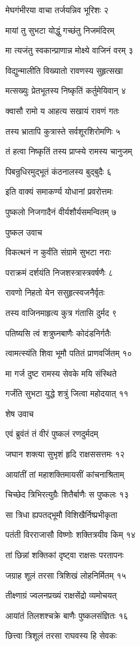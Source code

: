 मेघगंभीरया वाचा तर्जयन्निव भूरिशः २

मायां तु सुभटा योद्धुं गच्छंतु निजमंदिरम्

मा त्यजंतु स्वकान्प्राणान्न मोक्ष्ये वाजिनं वरम् ३

विद्युन्मालीति विख्यातो रावणस्य सुहृत्सखा

मत्सख्युः प्रेतभूतस्य निष्कृतिं कर्तुमेयिवान् ४

क्वासौ रामो य आहत्य सखायं रावणं गतः

तस्य भ्रातापि कुत्रास्ते सर्वशूरशिरोमणिः ५

तं हत्वा निष्कृतिं तस्य प्राप्स्ये रामस्य चानुजम्

पिबन्रुधिरमुद्भूतं कंठनालस्य बुद्बुदैः ६

इति वाक्यं समाकर्ण्य योधानां प्रवरोत्तमः

पुष्कलो निजगादैनं वीर्यशौर्यसमन्वितम् ७

पुष्कल उवाच

विकत्थनं न कुर्वंति संग्रामे सुभटा नराः

पराक्रमं दर्शयंति निजशस्त्रास्त्रवर्षणैः ८

रावणो निहतो येन ससुहृत्स्वजनैर्वृतः

तस्य वाजिनमाहृत्य कुत्र गंतासि दुर्मद ९

पतिष्यसि त्वं शत्रुघ्नबाणैः कोदंडनिर्गतैः

त्वामत्स्यंति शिवा भूमौ पतितं प्राणवर्जितम् १०

मा गर्ज दुष्ट रामस्य सेवके मयि संस्थिते

गर्जंति सुभटा युद्धे शत्रुं जित्वा महोदयात् ११

शेष उवाच

एवं ब्रुवंतं तं वीरं पुष्कलं रणदुर्मदम्

जघान शक्त्या सुभृशं हृदि राक्षससत्तमः १२

आयांतीं तां महाशक्तिमायसीं कांचनाश्रिताम्

चिच्छेद त्रिभिरत्युग्रैः शितैर्बाणैः स पुष्कलः १३

सा त्रिधा ह्यपतद्भूमौ विशिखैर्निष्प्रभीकृता

पतंती विरराजासौ विष्णोः शक्तित्रयीव किम् १४

तां छिन्नां शक्तिकां दृष्ट्वा राक्षसः परतापनः

जग्राह शूलं तरसा त्रिशिखं लोहनिर्मितम् १५

तीक्ष्णाग्रं ज्वलनप्रख्यं राक्षसेंद्रो व्यमोचयत्

आयांतं तिलशश्चक्रे बाणैः पुष्कलसंज्ञितः १६

छित्त्वा त्रिशूलं तरसा राघवस्य हि सेवकः

